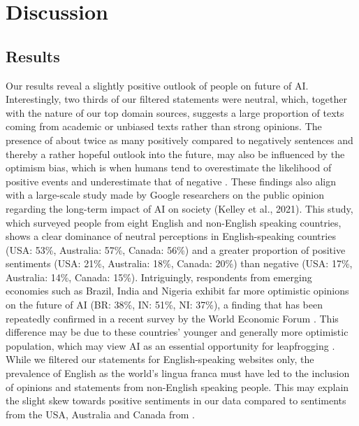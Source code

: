 \section{Discussion}

\subsection{Results}
Our results reveal a slightly positive outlook of people on future of AI. Interestingly, two thirds of our filtered statements were neutral, which, together with the nature of our top domain sources, suggests a large proportion of texts coming from academic or unbiased texts rather than strong opinions. The presence of about twice as many positively compared to negatively sentences and thereby a rather hopeful outlook into the future, may also be influenced by the optimism bias, which is when humans tend to overestimate the likelihood of positive events and underestimate that of negative \citep{sharot2011optimism}. These findings also align with a large-scale study made by Google researchers on the public opinion regarding the long-term impact of AI on society (Kelley et al., 2021). This study, which surveyed people from eight English and non-English speaking countries, shows a clear dominance of neutral perceptions in English-speaking countries (USA: 53\%, Australia: 57\%, Canada: 56\%) and a greater proportion of positive sentiments (USA: 21\%, Australia: 18\%, Canada: 20\%) than negative (USA: 17\%, Australia: 14\%, Canada: 15\%). Intriguingly, respondents from emerging economies such as Brazil, India and Nigeria exhibit far more optimistic opinions on the future of AI (BR: 38\%, IN: 51\%, NI: 37\%), a finding that has been repeatedly confirmed in a recent survey by the World Economic Forum \citep{Markovitz2022}. This difference may be due to these countries’ younger and generally more optimistic population, which may view AI as an essential opportunity for leapfrogging \citep{zhenmin2019frontier}. While we filtered our statements for English-speaking websites only, the prevalence of English as the world’s lingua franca must have led to the inclusion of opinions and statements from non-English speaking people. This may explain the slight skew towards positive sentiments in our data compared to sentiments from the USA, Australia and Canada from \citet{kelley2021exciting}.
